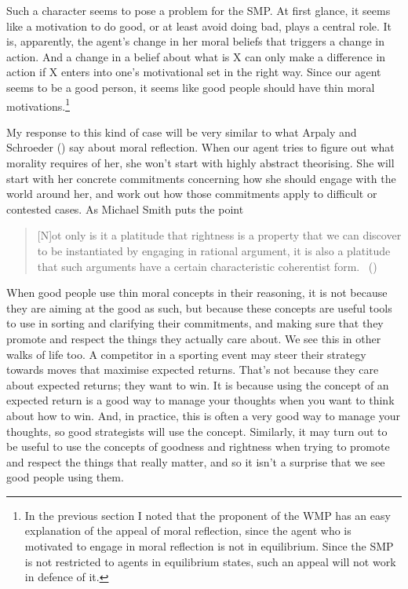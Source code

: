 \documentclass[
  10pt,
  letterpaper,
  twoside]{scrbook}
\begin{document}
Such a character seems to pose a problem for the SMP. At first glance,
it seems like a motivation to do good, or at least avoid doing bad,
plays a central role. It is, apparently, the agent's change in her moral
beliefs that triggers a change in action. And a change in a belief about
what is X can only make a difference in action if X enters into one's
motivational set in the right way. Since our agent seems to be a good
person, it seems like good people should have thin moral
motivations.\footnote{In the previous section I noted that the proponent
  of the WMP has an easy explanation of the appeal of moral reflection,
  since the agent who is motivated to engage in moral reflection is not
  in equilibrium. Since the SMP is not restricted to agents in
  equilibrium states, such an appeal will not work in defence of it.}

My response to this kind of case will be very similar to what Arpaly and
Schroeder () say about
moral reflection. When our agent tries to figure out what morality
requires of her, she won't start with highly abstract theorising. She
will start with her concrete commitments concerning how she should
engage with the world around her, and work out how those commitments
apply to difficult or contested cases. As Michael Smith puts the point

\begin{quote}
{[}N{]}ot only is it a platitude that rightness is a property that we
can discover to be instantiated by engaging in rational argument, it is
also a platitude that such arguments have a certain characteristic
coherentist form. ~()
\end{quote}

When good people use thin moral concepts in their reasoning, it is not
because they are aiming at the good as such, but because these concepts
are useful tools to use in sorting and clarifying their commitments, and
making sure that they promote and respect the things they actually care
about. We see this in other walks of life too. A competitor in a
sporting event may steer their strategy towards moves that maximise
expected returns. That's not because they care about expected returns;
they want to win. It is because using the concept of an expected return
is a good way to manage your thoughts when you want to think about how
to win. And, in practice, this is often a very good way to manage your
thoughts, so good strategists will use the concept. Similarly, it may
turn out to be useful to use the concepts of goodness and rightness when
trying to promote and respect the things that really matter, and so it
isn't a surprise that we see good people using them.
\end{document}
